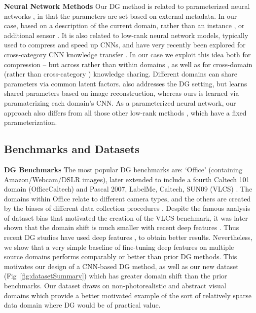 \documentclass[10pt,twocolumn,letterpaper]{article}
\begin{document}
\vspace{0.1cm}\noindent\textbf{Neural Network Methods}\quad
Our DG method is related to parameterized neural networks \cite{bertinetto2016feedForwardOneShot,sigaud2015gatedInventory}, in that the parameters are set based on external metadata. In our case, based on a description of the current domain, rather than an instance \cite{bertinetto2016feedForwardOneShot}, or additional sensor \cite{sigaud2015gatedInventory}. It is also related to low-rank neural network models, typically used to compress \cite{kim2016compressionCNN} and speed up \cite{lebedev2015cpDecompCNN} CNNs, and have very recently been explored for cross-category CNN knowledge transfer \cite{yang2017deepMTRL}. In our case we exploit this idea both for compression -- but across rather than within domains \cite{kim2016compressionCNN}, as well as for cross-domain (rather than cross-category \cite{yang2017deepMTRL}) knowledge sharing. Different domains can share parameters via common latent factors. \cite{bousmalis2016domain} also addresses the DG setting, but learns  shared parameters based on image reconstruction, whereas ours is learned via paramaterizing each domain's CNN.
As a parameterized neural network, our approach also differs from all those other low-rank methods \cite{kim2016compressionCNN,lebedev2015cpDecompCNN,yang2017deepMTRL}, which have a fixed parameterization.

\subsection{Benchmarks and Datasets} 
\noindent\textbf{DG Benchmarks}\quad
The most popular DG benchmarks are: `Office' \cite{saenko2010domainAdapt} (containing Amazon/Webcam/DSLR images), later extended to include a fourth Caltech 101 domain \cite{gong2012geodesicFlowDA} (OfficeCaltech) and Pascal 2007, LabelMe, Caltech, SUN09 (VLCS)  \cite{torralba2011dataset_bias,ECCV12_Khosla}. The domains within Office relate to different camera types, and the others are created by the biases of different data collection procedures \cite{torralba2011dataset_bias}. Despite the famous analysis of dataset bias \cite{torralba2011dataset_bias} that motivated the creation of the VLCS benchmark, it was later shown that the domain shift is much smaller with recent deep features \cite{donahue2014decaf}. Thus recent DG studies have used deep features \cite{ghifary2015domain}, to obtain better results. Nevertheless, we show that a very simple baseline of fine-tuning deep features on multiple source domains performs comparably or better than prior DG methods. This motivates our design of a CNN-based DG method, as well as our new dataset (Fig~\ref{fig:datasetSummary}) which  has greater domain shift than the prior benchmarks.  Our dataset draws on non-photorealistic and abstract visual domains which provide a better motivated example of the sort of relatively sparse data domain where DG would be of practical value.
\end{document}
